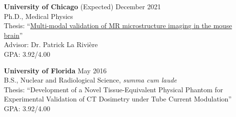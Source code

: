 \documentclass[10pt,letterpaper]{article}
\begin{document}
\begin{benumerate}{2}
\item
  \textbf{University of Chicago} \hfill (Expected) December 2021\\
  Ph.D., Medical Physics\\
  Thesis: ``\href{https://www.proquest.com/openview/5ce6c9b022b339d81e3cd47cc0cdf8fa/1?pq-origsite=gscholar&cbl=18750&diss=y}{Multi-modal validation of MR microstructure imaging in the mouse brain}''\\
  Advisor: Dr. Patrick La Rivi\`ere \\
  GPA: 3.92/4.00\\
\item
  \textbf{University of Florida} \hfill May 2016\\
  B.S., Nuclear and Radiological Science, \textit{summa cum laude}\\
  Thesis: ``Development of a Novel Tissue-Equivalent Physical Phantom for Experimental Validation
  of CT Dosimetry under Tube Current Modulation''\\ 
  GPA: 3.92/4.00\\
\end{benumerate}
\end{document}
